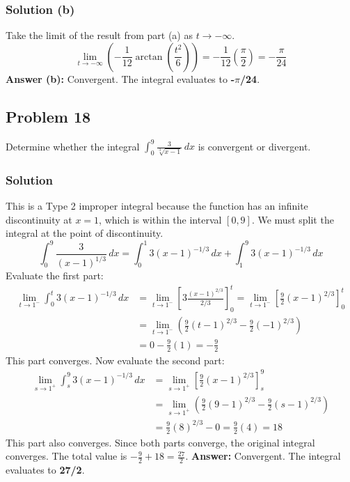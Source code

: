 \documentclass{article}
\begin{document}
\subsubsection*{Solution (b)}
Take the limit of the result from part (a) as $ t \to -\infty $.
\[ \lim_{t \to -\infty} \left(-\frac{1}{12}\arctan\left(\frac{t^2}{6}\right)\right) = -\frac{1}{12}\left(\frac{\pi}{2}\right) = -\frac{\pi}{24} \]
\textbf{Answer (b):} Convergent. The integral evaluates to \textbf{-$\pi$/24}.

\subsection{Problem 18}
Determine whether the integral $ \int_{0}^{9} \frac{3}{\sqrt[3]{x-1}} \,dx $ is convergent or divergent.
\subsubsection*{Solution}
This is a Type 2 improper integral because the function has an infinite discontinuity at $ x=1 $, which is within the interval $ [0,9] $. We must split the integral at the point of discontinuity.
\[ \int_{0}^{9} \frac{3}{(x-1)^{1/3}} \,dx = \int_{0}^{1} 3(x-1)^{-1/3} \,dx + \int_{1}^{9} 3(x-1)^{-1/3} \,dx \]
Evaluate the first part:
\begin{align*}
    \lim_{t \to 1^-} \int_{0}^{t} 3(x-1)^{-1/3} \,dx &= \lim_{t \to 1^-} \left[ 3 \frac{(x-1)^{2/3}}{2/3} \right]_{0}^{t} = \lim_{t \to 1^-} \left[ \frac{9}{2}(x-1)^{2/3} \right]_{0}^{t} \\
    &= \lim_{t \to 1^-} \left( \frac{9}{2}(t-1)^{2/3} - \frac{9}{2}(-1)^{2/3} \right) \\
    &= 0 - \frac{9}{2}(1) = -\frac{9}{2}
\end{align*}
This part converges. Now evaluate the second part:
\begin{align*}
    \lim_{s \to 1^+} \int_{s}^{9} 3(x-1)^{-1/3} \,dx &= \lim_{s \to 1^+} \left[ \frac{9}{2}(x-1)^{2/3} \right]_{s}^{9} \\
    &= \lim_{s \to 1^+} \left( \frac{9}{2}(9-1)^{2/3} - \frac{9}{2}(s-1)^{2/3} \right) \\
    &= \frac{9}{2}(8)^{2/3} - 0 = \frac{9}{2}(4) = 18
\end{align*}
This part also converges. Since both parts converge, the original integral converges. The total value is $ -\frac{9}{2} + 18 = \frac{27}{2} $.
\textbf{Answer:} Convergent. The integral evaluates to \textbf{27/2}.
\end{document}
